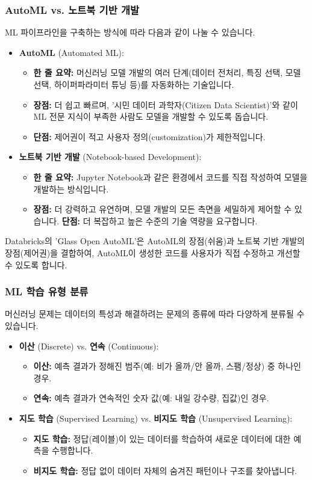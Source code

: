 \documentclass[11pt,a4paper]{article}
\theoremstyle{definition}
\begin{document}
\subsubsection*{AutoML vs. 노트북 기반 개발}
ML 파이프라인을 구축하는 방식에 따라 다음과 같이 나눌 수 있습니다.
\begin{itemize}
    \item \textbf{AutoML} (Automated ML):
    \begin{itemize}
        \item \textbf{한 줄 요약:} 머신러닝 모델 개발의 여러 단계(데이터 전처리, 특징 선택, 모델 선택, 하이퍼파라미터 튜닝 등)를 자동화하는 기술입니다.
        \item \textbf{장점:} 더 쉽고 빠르며, '시민 데이터 과학자(Citizen Data Scientist)'와 같이 ML 전문 지식이 부족한 사람도 모델을 개발할 수 있도록 돕습니다.
        \item \textbf{단점:} 제어권이 적고 사용자 정의(customization)가 제한적입니다.
    \end{itemize}
    \item \textbf{노트북 기반 개발} (Notebook-based Development):
    \begin{itemize}
        \item \textbf{한 줄 요약:} Jupyter Notebook과 같은 환경에서 코드를 직접 작성하여 모델을 개발하는 방식입니다.
        \item \textbf{장점:} 더 강력하고 유연하며, 모델 개발의 모든 측면을 세밀하게 제어할 수 있습니다.
        \textbf{단점:} 더 복잡하고 높은 수준의 기술 역량을 요구합니다.
    \end{itemize}
\end{itemize}
Databricks의 'Glass Open AutoML'은 AutoML의 장점(쉬움)과 노트북 기반 개발의 장점(제어권)을 결합하여, AutoML이 생성한 코드를 사용자가 직접 수정하고 개선할 수 있도록 합니다.

\subsubsection*{ML 학습 유형 분류}
머신러닝 문제는 데이터의 특성과 해결하려는 문제의 종류에 따라 다양하게 분류될 수 있습니다.
\begin{itemize}
    \item \textbf{이산} (Discrete) vs. \textbf{연속} (Continuous):
    \begin{itemize}
        \item \textbf{이산:} 예측 결과가 정해진 범주(예: 비가 올까/안 올까, 스팸/정상) 중 하나인 경우.
        \item \textbf{연속:} 예측 결과가 연속적인 숫자 값(예: 내일 강수량, 집값)인 경우.
    \end{itemize}
    \item \textbf{지도 학습} (Supervised Learning) vs. \textbf{비지도 학습} (Unsupervised Learning):
    \begin{itemize}
        \item \textbf{지도 학습:} 정답(레이블)이 있는 데이터를 학습하여 새로운 데이터에 대한 예측을 수행합니다.
        \item \textbf{비지도 학습:} 정답 없이 데이터 자체의 숨겨진 패턴이나 구조를 찾아냅니다.
    \end{itemize}
\end{itemize}
\end{document}
